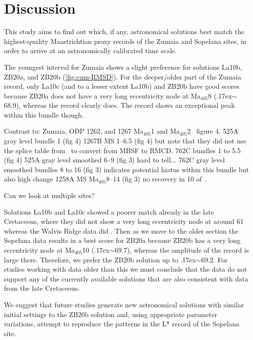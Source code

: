 \documentclass[draft]{agujournal2019}
\newcommand{\appr}{\raise.17ex\hbox{\(\scriptstyle\sim\)}} %
\newcommand{\ma}[1]{Ma\(_{405}\)#1}
\begin{document}
\section{Discussion}\label{sec:discussion}

This study aims to find out which, if any, astronomical solutions best match the highest-quality Maastrichtian proxy records of the Zumaia and Sopelana sites, in order to arrive at an astronomically calibrated time scale.

The youngest interval for Zumaia shows a slight preference for solutions La10b, ZB20a, and ZB20b (\cref{fig:cum-RMSD}).
For the deeper/older part of the Zumaia record, only La10c (and to a lesser extent La10b) and ZB20b have good scores because ZB20a does not have a very long eccentricity node at \ma{8} (\appr\qty{68.9}{\millionyearago}), whereas the record clearly does.
The record shows an exceptional peak within this bundle though.

Contrast to: Zumaia, ODP 1262, and 1267 \ma{1} and \ma{2}~\cite{Westerhold2008} figure 4.
525A gray level bundle 1 (fig 4)
1267B MS 1--6.5 (fig 4) but note that they did not use the splice table from~\cite{Westerhold2008} to convert from MBSF to RMCD.
762C bundles 1 to 5.5 (fig 4)
525A gray level smoothed 6--9 (fig 3) hard to tell...
762C gray level smoothed bundles 8 to 16 (fig 3) indicates potential hiatus within this bundle but also high change
1258A MS \ma{8--14} (fig 3) no recovery in 10
of~.

Can we look at multiple sites?


Solutions La10b and La10c showed a poorer match already in the late Cretaceous, where they did not show a very long eccentricity node at around \qty{61}{\millionyearago} whereas the Walvis Ridge data did \cite{ZeebeLourens2022EPSL}.
Then as we move to the older section the Sopelana data results in a best score for ZB20a because ZB20b has a very long eccentricity node at \ma{10} (\appr\qty{69.7}{\millionyearago}), whereas the amplitude of the record is large there.
Therefore, we prefer the ZB20b solution up to \appr\qty{69.2}{\millionyearago}.
For studies working with data older than this we must conclude that the data do not support any of the currently available solutions that are also consistent with data from the late Cretaceous.

We suggest that future studies generate new astronomical solutions with similar initial settings to the ZB20b solution and, using appropriate parameter variations, attempt to reproduce the patterns in the \gls{L*} record of the Sopelana site.
\end{document}
